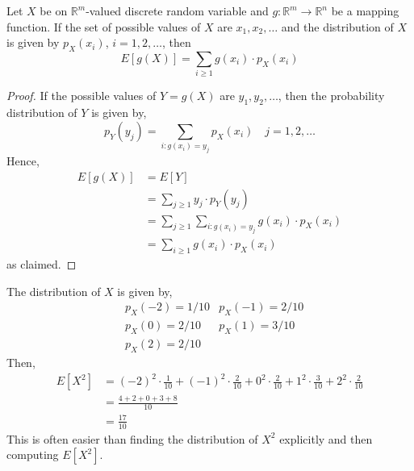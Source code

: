 \begin{theorem}
    Let $X$ be on $\mathbb{R}^m$-valued discrete random variable and $g :
\mathbb{R}^m \rightarrow \mathbb{R}^n$ be a mapping function. If the set of
possible values of $X$ are $x_1, x_2, \dots$ and the distribution of $X$ is
given by $p_X(x_i)$, $i = 1, 2, \dots$, then
\begin{equation*}
    E[g(X)] = \sum_{i \geq 1} g(x_i) \cdot p_X(x_i)
\end{equation*}
\end{theorem}
\begin{proof}
    If the possible values of $Y = g(X)$ are $y_1, y_2, \dots$, then the
probability distribution of $Y$ is given by,
\begin{equation*}
    p_Y(y_j) = \sum_{i : g(x_i) = y_j} p_X(x_i) \quad j = 1, 2, \dots
\end{equation*}
Hence,
\begin{align*}
    E[g(X)] &= E[Y]                                                          \\
            &= \sum_{j \geq 1} y_j \cdot p_Y(y_j)                            \\
            &= \sum_{j \geq 1} \sum_{i : g(x_i) = y_j} g(x_i) \cdot p_X(x_i) \\
            &= \sum_{i \geq 1} g(x_i) \cdot p_X(x_i)
\end{align*}
as claimed.
\end{proof}

\begin{example}
    The distribution of $X$ is given by,
    \begin{align*}
        &p_X(-2) = 1 / 10                     &p_X(-1) = 2 / 10              \\
        &p_X(0) = 2 / 10                      &p_X(1) = 3 / 10               \\
        &p_X(2) = 2 / 10                      &
    \end{align*}
    Then,
    \begin{align*}
        E[X^2] &= (-2)^2 \cdot \frac{1}{10} +
                  (-1)^2 \cdot \frac{2}{10} +
                  0^2 \cdot \frac{2}{10} +
                  1^2 \cdot \frac{3}{10} +
                  2^2 \cdot \frac{2}{10}                                     \\
               &= \frac{4 + 2 + 0 + 3 + 8}{10}                               \\
               &= \frac{17}{10}
    \end{align*}
    This is often easier than finding the distribution of $X^2$ explicitly and
then computing $E[X^2]$.
\end{example}

